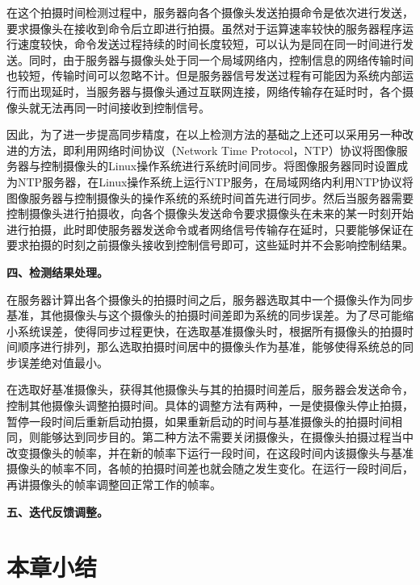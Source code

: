 在这个拍摄时间检测过程中，服务器向各个摄像头发送拍摄命令是依次进行发送，要求摄像头在接收到命令后立即进行拍摄。虽然对于运算速率较快的服务器程序运行速度较快，命令发送过程持续的时间长度较短，可以认为是同在同一时间进行发送。同时，由于服务器与摄像头处于同一个局域网络内，控制信息的网络传输时间也较短，传输时间可以忽略不计。但是服务器信号发送过程有可能因为系统内部运行而出现延时，当服务器与摄像头通过互联网连接，网络传输存在延时时，各个摄像头就无法再同一时间接收到控制信号。

因此，为了进一步提高同步精度，在以上检测方法的基础之上还可以采用另一种改进的方法，即利用网络时间协议（Network Time Protocol，NTP）协议将图像服务器与控制摄像头的Linux操作系统进行系统时间同步。将图像服务器同时设置成为NTP服务器，在Linux操作系统上运行NTP服务，在局域网络内利用NTP协议将图像服务器与控制摄像头的操作系统的系统时间首先进行同步。然后当服务器需要控制摄像头进行拍摄收，向各个摄像头发送命令要求摄像头在未来的某一时刻开始进行拍摄，此时即使服务器发送命令或者网络信号传输存在延时，只要能够保证在要求拍摄的时刻之前摄像头接收到控制信号即可，这些延时并不会影响控制结果。

\textbf{四、检测结果处理。}

在服务器计算出各个摄像头的拍摄时间之后，服务器选取其中一个摄像头作为同步基准，其他摄像头与这个摄像头的拍摄时间差即为系统的同步误差。为了尽可能缩小系统误差，使得同步过程更快，在选取基准摄像头时，根据所有摄像头的拍摄时间顺序进行排列，那么选取拍摄时间居中的摄像头作为基准，能够使得系统总的同步误差绝对值最小。

在选取好基准摄像头，获得其他摄像头与其的拍摄时间差后，服务器会发送命令，控制其他摄像头调整拍摄时间。具体的调整方法有两种，一是使摄像头停止拍摄，暂停一段时间后重新启动拍摄，如果重新启动的时间与基准摄像头的拍摄时间相同，则能够达到同步目的。第二种方法不需要关闭摄像头，在摄像头拍摄过程当中改变摄像头的帧率，并在新的帧率下运行一段时间，在这段时间内该摄像头与基准摄像头的帧率不同，各帧的拍摄时间差也就会随之发生变化。在运行一段时间后，再讲摄像头的帧率调整回正常工作的帧率。



\textbf{五、迭代反馈调整。}

\section{本章小结}


